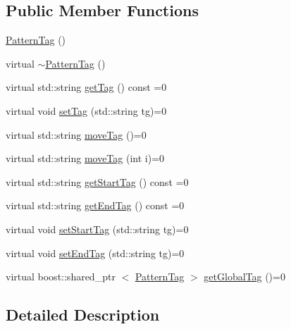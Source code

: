 \subsection*{\-Public \-Member \-Functions}
\begin{DoxyCompactItemize}
\item 
\hyperlink{classcryomesh_1_1state_1_1PatternTag_ab4743b4692605d766378994b87d786ed}{\-Pattern\-Tag} ()
\item 
virtual \hyperlink{classcryomesh_1_1state_1_1PatternTag_aa5239974dfc79638f346145d28ddf961}{$\sim$\-Pattern\-Tag} ()
\item 
virtual std\-::string \hyperlink{classcryomesh_1_1state_1_1PatternTag_a00c56f1f6f348e51a9c02338abf3e5ab}{get\-Tag} () const =0
\item 
virtual void \hyperlink{classcryomesh_1_1state_1_1PatternTag_a17830f089a443437fa736460e231706e}{set\-Tag} (std\-::string tg)=0
\item 
virtual std\-::string \hyperlink{classcryomesh_1_1state_1_1PatternTag_a0b22ab8e03558ed9a2370a66b67761a0}{move\-Tag} ()=0
\item 
virtual std\-::string \hyperlink{classcryomesh_1_1state_1_1PatternTag_ac904d5f971af7e9930ce85a256097c48}{move\-Tag} (int i)=0
\item 
virtual std\-::string \hyperlink{classcryomesh_1_1state_1_1PatternTag_a19284a4419275776a7277af2de158620}{get\-Start\-Tag} () const =0
\item 
virtual std\-::string \hyperlink{classcryomesh_1_1state_1_1PatternTag_ae6a5eb0d13e5152a33de9527c66d358b}{get\-End\-Tag} () const =0
\item 
virtual void \hyperlink{classcryomesh_1_1state_1_1PatternTag_a0c7e050117e2cc5d146b90efad122561}{set\-Start\-Tag} (std\-::string tg)=0
\item 
virtual void \hyperlink{classcryomesh_1_1state_1_1PatternTag_a5026dd228cf678c58267ff343ff84e04}{set\-End\-Tag} (std\-::string tg)=0
\item 
virtual boost\-::shared\-\_\-ptr\*
$<$ \hyperlink{classcryomesh_1_1state_1_1PatternTag}{\-Pattern\-Tag} $>$ \hyperlink{classcryomesh_1_1state_1_1PatternTag_ae689bd0c2045fbb30f482123adfe4657}{get\-Global\-Tag} ()=0
\end{DoxyCompactItemize}


\subsection{\-Detailed \-Description}



